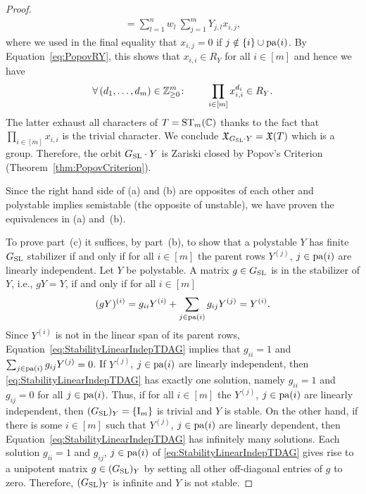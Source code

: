 \begin{proof}
\begin{align*}
			= \sum_{l=1}^n w_l \: \sum_{j=1}^m Y_{j,l} x_{i,j} ,
		\end{align*}
	where we used in the final equality that $x_{i,j} = 0$ if $j \notin \{i\} \cup \operatorname{pa}(i)$.
	By Equation~\eqref{eq:PopovRY}, this shows that $x_{i,i} \in R_Y$ for all $i \in [m]$ and hence we have
		\[ \forall \, (d_1,\ldots,d_m)\in \mathbb Z_{\geq 0}^m \colon \qquad  \prod_{i \in [m]} x_{i,i}^{d_i} \in R_Y .\]
	The latter exhaust all characters of $T = \operatorname{ST}_m(\mathbb C)$ thanks to the fact that $\prod_{i \in [m]} x_{i,i}$ is the trivial character.
	We conclude $\mathfrak{X}_{G_{\operatorname{SL}} \cdot Y} = \mathfrak{X}(T)$ which is a group. Therefore, the orbit $G_{\operatorname{SL}} \cdot Y$ is Zariski closed by Popov's Criterion (Theorem~\ref{thm:PopovCriterion}).
	
	Since the right hand side of (a) and (b) are opposites of each other and polystable implies semistable (the opposite of unstable), we have proven the equivalences in (a) and~(b).
	
	To prove part~(c) it suffices, by part~(b), to show that a polystable $Y$ has finite $G_{\operatorname{SL}}$ stabilizer if and only if for all $i \in [m]$ the parent rows $Y^{(j)}$, $j \in \operatorname{pa}(i)$ are linearly independent. Let $Y$ be polystable. A matrix $g \in G_{\operatorname{SL}}$ is in the stabilizer of $Y$, i.e., $gY = Y$, if and only if for all $i \in [m]$
		\begin{equation}\label{eq:StabilityLinearIndepTDAG}
			(gY)^{(i)} = g_{ii} Y^{(i)} + \sum_{j \in \operatorname{pa}(i)} g_{ij} Y^{(j)} = Y^{(i)}.
		\end{equation}
	Since $Y^{(i)}$ is not in the linear span of its parent rows, Equation~\eqref{eq:StabilityLinearIndepTDAG} implies that $g_{ii} = 1$ and $\sum_{j \in \operatorname{pa}(i)} g_{ij} Y^{(j)} = 0$. If $Y^{(j)}$, $j \in \operatorname{pa}(i)$ are linearly independent, then \eqref{eq:StabilityLinearIndepTDAG} has exactly one solution, namely $g_{ii} = 1$ and $g_{ij} = 0$ for all $j \in \operatorname{pa}(i)$. Thus, if for all $i \in [m]$ the $Y^{(j)}$, $j \in \operatorname{pa}(i)$ are linearly independent, then $(G_{\operatorname{SL}})_Y = \{\operatorname{I}_m \}$ is trivial and $Y$ is stable.
	On the other hand, if there is some $i \in [m]$ such that $Y^{(j)}$, $j \in \operatorname{pa}(i)$ are linearly dependent, then Equation~\eqref{eq:StabilityLinearIndepTDAG} has infinitely many solutions. Each solution $g_{ii} = 1$ and $g_{ij}$, $j \in \operatorname{pa}(i)$ of \eqref{eq:StabilityLinearIndepTDAG} gives rise to a unipotent matrix $g \in (G_{\operatorname{SL}})_Y$ by setting all other off-diagonal entries of $g$ to zero. Therefore, $(G_{\operatorname{SL}})_Y$ is infinite and $Y$ is not stable.
\end{proof}

